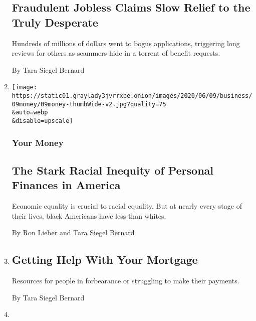 \begin{enumerate}
{  \subsection{Fraudulent Jobless Claims Slow Relief to the Truly
  Desperate}\label{fraudulent-jobless-claims-slow-relief-to-the-truly-desperate}}

  Hundreds of millions of dollars went to bogus applications, triggering
  long reviews for others as scammers hide in a torrent of benefit
  requests.

  By Tara Siegel Bernard
\item
  \href{/2020/06/09/your-money/race-income-equality.html}{}

  \texttt{[image: https://static01.graylady3jvrrxbe.onion/images/2020/06/09/business/09money/09money-thumbWide-v2.jpg?quality=75\\\&auto=webp\\\&disable=upscale]}

  \hypertarget{your-money}{%
  \subsubsection{Your Money}\label{your-money}}

  \hypertarget{the-stark-racial-inequity-of-personal-finances-in-america}{%
  \subsection{The Stark Racial Inequity of Personal Finances in
  America}\label{the-stark-racial-inequity-of-personal-finances-in-america}}

  Economic equality is crucial to racial equality. But at nearly every
  stage of their lives, black Americans have less than whites.

  By Ron Lieber and Tara Siegel Bernard
\item
  \href{/2020/05/15/business/covid-mortgage-forbearance.html}{}

  \hypertarget{getting-help-with-your-mortgage}{%
  \subsection{Getting Help With Your
  Mortgage}\label{getting-help-with-your-mortgage}}

  Resources for people in forbearance or struggling to make their
  payments.

  By Tara Siegel Bernard
\item
  \href{/2020/05/15/business/coronavirus-mortgage-relief.html}{}


\end{enumerate}
